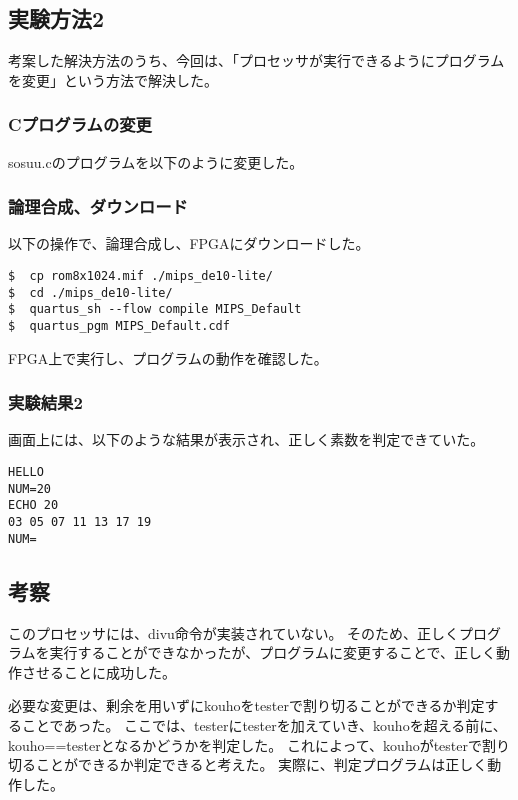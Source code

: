 \subsection{実験方法2}
考案した解決方法のうち、今回は、「プロセッサが実行できるようにプログラムを変更」という方法で解決した。

\subsubsection{Cプログラムの変更}
sosuu.cのプログラムを以下のように変更した。


\subsubsection{論理合成、ダウンロード}
以下の操作で、論理合成し、FPGAにダウンロードした。
\begin{lstlisting}[caption={論理合成、ダウンロード},label={論理合成、ダウンロード6-1}]
$  cp rom8x1024.mif ./mips_de10-lite/
$  cd ./mips_de10-lite/
$  quartus_sh --flow compile MIPS_Default
$  quartus_pgm MIPS_Default.cdf
\end{lstlisting}

FPGA上で実行し、プログラムの動作を確認した。

\subsubsection{実験結果2}
画面上には、以下のような結果が表示され、正しく素数を判定できていた。
\begin{lstlisting}[caption={実行結果2},label={実行結果27}]
HELLO
NUM=20
ECHO 20
03 05 07 11 13 17 19
NUM=
\end{lstlisting}

\subsection{考察}
このプロセッサには、divu命令が実装されていない。
そのため、正しくプログラムを実行することができなかったが、プログラムに変更することで、正しく動作させることに成功した。

必要な変更は、剰余を用いずにkouhoをtesterで割り切ることができるか判定することであった。
ここでは、testerにtesterを加えていき、kouhoを超える前に、kouho==testerとなるかどうかを判定した。
これによって、kouhoがtesterで割り切ることができるか判定できると考えた。
実際に、判定プログラムは正しく動作した。

